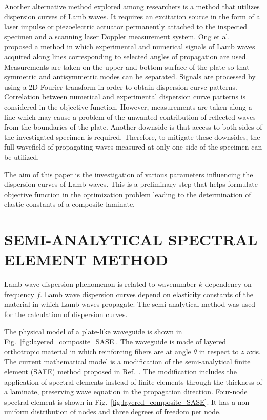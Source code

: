 \documentclass[]{spie}  %
\begin{document}
Another alternative method explored among researchers is a method that utilizes dispersion curves of Lamb waves.
It requires an excitation source in the form of a laser impulse or piezoelectric actuator permanently attached to the inspected specimen and a scanning laser Doppler measurement system.
Ong et al.~\cite{Ong2016} proposed a method in which experimental and numerical signals of Lamb waves acquired along lines corresponding to selected angles of propagation are used. 
Measurements are taken on the upper and bottom surface of the plate so that symmetric and antisymmetric modes can be separated.
Signals are processed by using a 2D Fourier transform in order to obtain dispersion curve patterns. 
Correlation between numerical and experimental dispersion curve patterns is considered in the objective function.
However, measurements are taken along a line which may cause a problem of the unwanted contribution of reflected waves from the boundaries of the plate.
Another downside is that access to both sides of the investigated specimen is required.
Therefore, to mitigate these downsides, the full wavefield of propagating waves measured at only one side of the specimen can be utilized.

The aim of this paper is the investigation of various parameters influencing the dispersion curves of Lamb waves.
This is a preliminary step that helps formulate objective function in the optimization problem leading to the determination of elastic constants of a composite laminate.

\section{SEMI-ANALYTICAL SPECTRAL ELEMENT METHOD}
\label{sec:sase}
Lamb wave dispersion phenomenon is related to wavenumber  \(k\) dependency on frequency \(f\). 
Lamb wave dispersion curves depend on elasticity constants of the material in which Lamb waves propagate.
The semi-analytical method was used for the calculation of dispersion curves.

The physical model of a plate-like waveguide is shown in Fig.~\ref{fig:layered_composite_SASE}.  
The waveguide is made of layered orthotropic material in which reinforcing fibers are at angle \(\theta\) in respect to \(z\) axis. 
The current mathematical model is a modification of the semi-analytical finite element (SAFE) method proposed in Ref.~. 
The modification includes the application of spectral elements instead of finite elements through the thickness of a laminate, preserving wave equation in the propagation direction. 
Four-node spectral element is shown in Fig.~\ref{fig:layered_composite_SASE}. 
It has a non-uniform distribution of nodes and three degrees of freedom per node.
\end{document}
